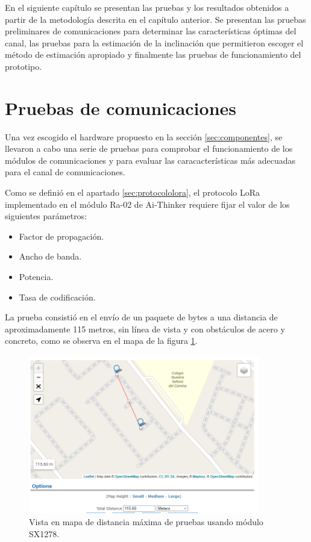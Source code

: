 
En el siguiente capítulo se presentan las pruebas y los resultados obtenidos a partir de la metodología descrita en el capítulo anterior. Se presentan las pruebas preliminares de comunicaciones para determinar las características óptimas del canal, las pruebas para la estimación de la inclinación que permitieron escoger el método de estimación apropiado y finalmente las pruebas de funcionamiento del prototipo.

\section{Pruebas de comunicaciones}



Una vez escogido el hardware propuesto en la sección \ref{sec:componentes}, se llevaron a cabo una serie de pruebas  para comprobar el funcionamiento de los módulos de comunicaciones y para evaluar las caracacterísticas más adecuadas para el canal de comunicaciones. 

Como se definió en el apartado \ref{sec:protocololora}, el protocolo LoRa implementado en el módulo Ra-02 de Ai-Thinker requiere fijar el valor de los siguientes parámetros:

\begin{itemize}
    \item Factor de propagación.
    \item Ancho de banda.
    \item Potencia.
    \item Tasa de codificación.
\end{itemize}

La prueba consistió en el envío de un paquete de bytes a una distancia de aproximadamente 115 metros, sin línea de vista y con obstáculos de acero y concreto, como se observa en el mapa de la figura \ref{fig:mapalora}.

\begin{figure}[H]
    \centering
    \includegraphics[width = 0.9\textwidth]{imagenes/cap3_resultados/Pruebas LoRa/MapaLora.png}
    \caption{Vista en mapa de distancia máxima de pruebas usando módulo SX1278.}
    \label{fig:mapalora}
\end{figure}

